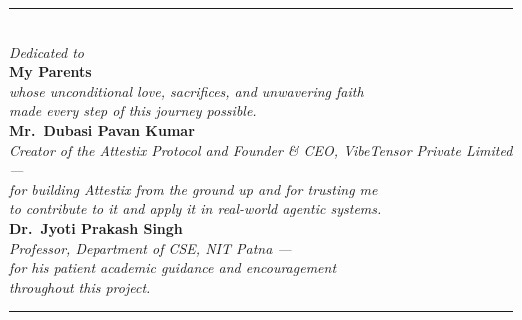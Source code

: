 \pagebreak
{}
\cleardoublepage
{}

\vspace*{\fill}

\begin{center}

\rule{\linewidth}{1pt}\\[1cm]

{\Large\textit{Dedicated to}}\\[1.2cm]

{\large\textbf{My Parents}}\\[0.4cm]
{\normalsize\textit{whose unconditional love, sacrifices, and unwavering faith\\
made every step of this journey possible.}}\\[1.2cm]

{\large\textbf{Mr.\ Dubasi Pavan Kumar}}\\[0.2cm]
{\normalsize\textit{Creator of the Attestix Protocol and Founder \& CEO, VibeTensor Private Limited ---\\
for building Attestix from the ground up and for trusting me\\
to contribute to it and apply it in real-world agentic systems.}}\\[1.2cm]

{\large\textbf{Dr.\ Jyoti Prakash Singh}}\\[0.2cm]
{\normalsize\textit{Professor, Department of CSE, NIT Patna ---\\
for his patient academic guidance and encouragement\\
throughout this project.}}\\[1.2cm]


\rule{\linewidth}{1pt}

\end{center}

\vspace*{\fill}
